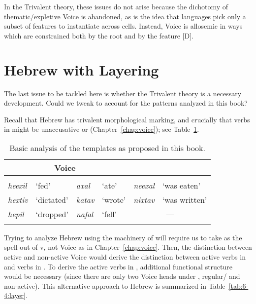 \begin{exe}
\begin{xlist}
\begin{exe}
\begin{exe}
\begin{xlist}
\begin{exe}
\begin{exe}
\begin{exe}
\begin{exe}
\begin{exe}
\begin{xlist}
\begin{exe}
In the Trivalent theory, these issues do not arise because the dichotomy of thematic/expletive Voice is abandoned, as is the idea that languages pick only a subset of features to instantiate across cells. Instead, Voice is allosemic in ways which are constrained both by the root and by the feature [D].


\section{Hebrew with Layering} \label{aas:hebrew}
The last issue to be tackled here is whether the Trivalent theory is a necessary development. Could we tweak  to account for the patterns analyzed in this book?

Recall that Hebrew has trivalent morphological marking, and crucially that verbs in {\tkal} might be unaccusative or  (Chapter~\ref{chap:voice}); see Table~\ref{table:aas:alternations-heb2}.
\begin{table}
	\begin{tabularx}{.75\textwidth}{llllll}
 \lsptoprule
	 \multicolumn{2}{c}{\textbf{\vd}}	&	\multicolumn{2}{c}{\textbf{Voice}}	& \multicolumn{2}{c}{\textbf{\vz}}\\\midrule
	\multicolumn{2}{c}{\thif}	&	\multicolumn{2}{c}{\tkal}	& \multicolumn{2}{c}{\tnif}\\
	\emph{heexil}	& `fed' &	\emph{axal}	& `ate'	&	\emph{neexal}	& `was eaten' \\
	\emph{hextiv}	& `dictated' &	\emph{katav}	& `wrote'	&	\emph{nixtav}	& `was written' \\ 
	\emph{hepil} & `dropped' & \emph{nafal}	& `fell' & \multicolumn{2}{c}{---}\\
\lspbottomrule
 	\end{tabularx}
		\caption{Basic analysis of the templates as proposed in this book.}
	\label{table:aas:alternations-heb2} 
\end{table}

Trying to analyze Hebrew using the machinery of  will require us to take {\tkal} as the spell out of v, not Voice as in Chapter~\ref{chap:voice}. Then, the distinction between active and non-active Voice would derive the distinction between active verbs in {\tkal} and verbs in {\tnif}. To derive the active verbs in {\thif}, additional functional structure would be necessary (since there are only two Voice heads under , regular/ and non-active). This alternative approach to Hebrew is summarized in Table~\ref{tab:6-4:layer}.


\end{exe}
\end{xlist}
\end{exe}
\end{exe}
\end{exe}
\end{exe}
\end{exe}
\end{xlist}
\end{exe}
\end{exe}
\end{xlist}
\end{exe}
